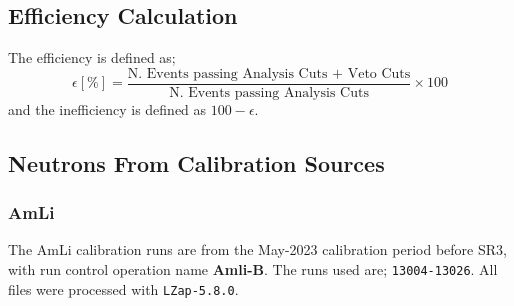 \subsection{Efficiency Calculation}
The efficiency is defined as;
\begin{equation}
    \epsilon [\%] = \frac{\textrm{N. Events passing Analysis Cuts + Veto Cuts}}{\textrm{N. Events passing Analysis Cuts}} \times 100
    \label{eq:neutron_tagging_efficiency}
\end{equation}
and the inefficiency is defined as $100 - \epsilon$.

\subsection{Neutrons From Calibration Sources \label{sec:AmLi_Efficiency}}
\subsubsection{AmLi} 
The AmLi calibration runs are from the May-2023 calibration period before SR3, with run control operation name \textbf{Amli-B}.
The runs used are; \lstinline{13004-13026}.
All files were processed with \lstinline{LZap-5.8.0}.

